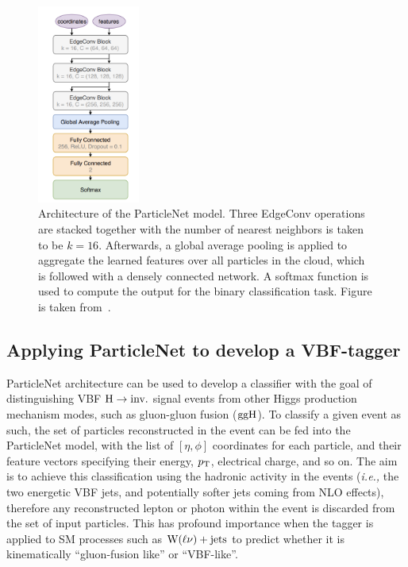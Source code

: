 \begin{figure}[htbp]
    \centering
    \includegraphics[width=0.3\textwidth]{VBFML/particlenet_arch.png}
    \caption{Architecture of the ParticleNet model. Three EdgeConv operations are stacked together
    with the number of nearest neighbors is taken to be $k=16$. Afterwards, a global average pooling
    is applied to aggregate the learned features over all particles in the cloud, which is followed
    with a densely connected network. A softmax function is used to compute the output for the binary
    classification task. Figure is taken from~\cite{CMS:ParticleNetPaper}.}
    \label{fig:particlenet_arch}
\end{figure}

\subsection{Applying ParticleNet to develop a VBF-tagger}

ParticleNet architecture can be used to develop a classifier with the goal of distinguishing VBF $\textrm{H} \rightarrow \textrm{inv.}$ signal events
from other Higgs production mechanism modes, such as gluon-gluon fusion ($\mathrm{ggH}$). 
To classify a given event as such, the set of particles reconstructed
in the event can be fed into the ParticleNet model, with the list of $[\eta, \phi]$ coordinates for each particle, and their feature
vectors specifying their energy, $p_{\textrm{T}}$, electrical charge, and so on. The aim is to achieve this classification using the hadronic
activity in the events (\textit{i.e.,} the two energetic VBF jets, and potentially softer jets coming from NLO effects), therefore any
reconstructed lepton or photon within the event is discarded from the set of input particles. This has profound importance
when the tagger is applied to SM processes such as $\textrm{W}(\ell\nu)+\textrm{jets}$ to predict whether it is kinematically ``gluon-fusion like'' or ``VBF-like''.

